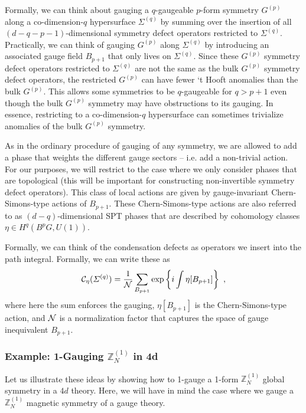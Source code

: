 \documentclass[11pt]{article}
\newcommand{\eq}[1]{\begin{align}\begin{split}#1\end{split}\end{align}}
\def\exp{{\rm exp}}
\def\CC {{\cal C}}
\def\CN {{\cal N}}
\def\IZ{{\mathbb{Z}}}
\begin{document}
Formally, we can think about gauging a $q$-gaugeable $p$-form symmetry $G^{(p)}$ along a co-dimension-$q$ hypersurface $\Sigma^{(q)}$ by summing over the insertion of all $(d-q-p-1)$-dimensional  symmetry defect operators restricted to $\Sigma^{(q)}$. Practically, we can think of gauging $G^{(p)}$ along $\Sigma^{(q)}$ by introducing an associated gauge field $B_{p+1}$ that only lives on $\Sigma^{(q)}$. Since these $G^{(p)}$ symmetry defect operators restricted to $\Sigma^{(q)}$ are not the same as the bulk $G^{(p)}$ symmetry defect operators, the restricted $G^{(p)}$ can have fewer `t Hooft anomalies than the bulk $G^{(p)}$. This allows some symmetries to be $q$-gaugeable for $q>p+1$ even though the bulk $G^{(p)}$ symmetry may have obstructions to its gauging. In essence, restricting to a co-dimension-$q$ hypersurface can sometimes trivialize anomalies of the bulk $G^{(p)}$ symmetry. 
 
As in the ordinary procedure of gauging of any symmetry, we are allowed to add a phase that weights the different gauge sectors -- i.e. add a non-trivial action. 
For our purposes, we will restrict to the case where we only consider phases  that are topological (this will be important for constructing non-invertible symmetry defect operators). This class of local actions are given by gauge-invariant Chern-Simons-type actions of $B_{p+1}$. These Chern-Simons-type actions are also referred to as $(d-q)$-dimensional SPT phases that are described by cohomology classes $\eta\in H^q(B^pG,U(1))$. 

Formally, we can think of the condensation defects as operators we insert into the path integral. Formally, we can write these as 
\eq{
\CC_\eta(\Sigma^{(q)})=\frac{1}{\CN}\sum_{B_{p+1}}\exp\left\{i \int \eta[B_{p+1}]\right\}~,
}
where here the sum enforces the gauging, $\eta[B_{p+1}]$ is the Chern-Simons-type action, and $\CN$ is a normalization factor that captures the space of gauge inequivalent $B_{p+1}$. 

\subsubsection{Example: 1-Gauging $\IZ_N^{(1)}$ in 4d}

Let us illustrate these ideas by showing how to 1-gauge a 1-form $\IZ_N^{(1)}$ global symmetry in a $4d$ theory. Here, we will have in mind the case where we gauge a $\IZ_N^{(1)}$ magnetic symmetry of a  gauge theory.
\end{document}
